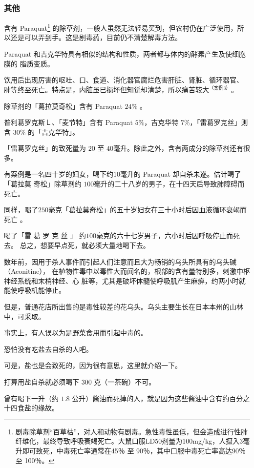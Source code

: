 \documentclass[UTF8]{ctexart}
\begin{document}
\subsubsection{其他}

含有 Paraquat\footnote{剧毒除草剂“百草枯”，对人和动物有剧毒。急性毒性虽低，但会造成进行性肺纤维化，最终导致呼吸衰竭死亡。大鼠口服LD50剂量为100mg/kg，人摄入3毫升即可致死，中毒死亡率通常在45％ 至 90％，其中口服中毒死亡率高达90％ 至 100％。} 的除草剂，一般人虽然无法轻易买到，但农村仍在广泛使用，所以还是可以弄到手。这是剧毒药，目前仍不清楚解毒方法。

Paraquat 和吉克华特具有相似的结构和性质，两者都与体内的酵素产生及使细胞膜的 脂质变质。

饮用后出现厉害的呕吐、口、食道、消化器官腐烂危害肝脏、肾脏、循环器官、 肺等终至死亡。特点是，内脏虽已损坏但知觉却清楚，所以痛苦较大$^{（案例 3）}$。

除草剂的「葛拉莫奇松」含有 Paraquat $24\%$ 。

普利葛罗克斯Ｌ、「麦节特」含有 Paraquat $5\%$，吉克华特 $7\%$，「雷葛罗克丝」则含 $30\%$ 的「吉克华特」。

「雷葛罗克丝」的致死量为 $20$ 至 $40$毫升。除此之外，含有两成分的除草剂还有很多。

有案例是一名四十岁的妇女，喝下约$10$毫升的 Paraquat 却自杀未遂。估计喝了「葛拉莫
奇松」除草剂约 $100$毫升的二十八岁的男子，在十四天后导致肺障碍而死亡。

同样，喝了$250$毫克「葛拉莫奇松」的五十岁妇女在三十小时后因血液循环衰竭而死亡 。

喝了「雷 葛 罗 克 丝 」 约$100$毫克的六十七岁男子，六小时后因呼吸停止而死去。
总之，想要早点死，就必须大量地喝下去。

数年前，因用于杀人事件而引起人们注意而且大为畅销的乌头所具有的乌头碱（Aconitine），
在植物性毒中以毒性大而闻名的，根部的含有量特别多，刺激中枢神经系统和末梢神经、心
脏等，尤其是破坏体髓使呼吸肌产生麻痹，约两小时就能使呼吸机能停止。

但是，普通花店所出售的是毒性较差的花乌头。乌头主要生长在日本本州的山林中，可采取。

事实上，有人误以为是野菜食用而引起中毒的。

恐怕没有吃盐去自杀的人吧。

可是，盐也是会致死的，因为很有意思，这里就介绍一下。

打算用盐自杀就必须喝下 $300$ 克（一茶碗）不可。

曾有喝下一升（约 $1.8$ 公升）酱油而死掉的人，就是因为这些酱油中含有约百分之十四食盐的缘故。
\end{document}
